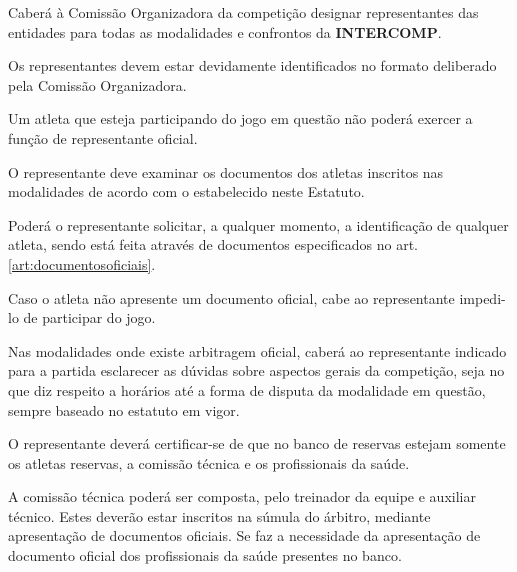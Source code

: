 \begin{article}
	Caberá à Comissão Organizadora da competição designar representantes das entidades para todas as modalidades e confrontos da \textbf{INTERCOMP}.
\end{article}

\begin{article}
	Os representantes devem estar devidamente identificados no formato deliberado pela Comissão Organizadora.
\end{article}

\begin{article}
	Um atleta que esteja participando do jogo em questão não poderá exercer a função de representante oficial.
\end{article}

\begin{article}
    \label{art:representantedocumentos}
	O representante deve examinar os documentos dos atletas inscritos nas modalidades de acordo com o estabelecido neste Estatuto.

	\begin{xparagraph}
	    Poderá o representante solicitar, a qualquer momento, a identificação de qualquer atleta, sendo está feita através de documentos especificados no art. \ref{art:documentosoficiais}\ulo.
	\end{xparagraph}

	\begin{xparagraph}
	    Caso o atleta não apresente um documento oficial, cabe ao representante impedi-lo de participar do jogo.
	\end{xparagraph}
\end{article}

\begin{article}
	Nas modalidades onde existe arbitragem oficial, caberá ao representante indicado para a partida esclarecer as dúvidas sobre aspectos gerais da competição, seja no que diz respeito a horários até a forma de disputa da modalidade em questão, sempre baseado no estatuto em vigor.
\end{article}

\begin{article}
	O representante deverá certificar-se de que no banco de reservas estejam somente os atletas reservas, a comissão técnica e os profissionais da saúde.

	\begin{xparagraph}
	    A comissão técnica poderá ser composta, pelo treinador da equipe e auxiliar técnico. Estes deverão estar inscritos na súmula do árbitro, mediante apresentação de documentos oficiais. Se faz a necessidade da apresentação de documento oficial dos profissionais da saúde presentes no banco.
	\end{xparagraph}
\end{article}


